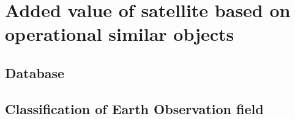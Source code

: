 \bigskip
\section{Added value of satellite based on operational similar objects}
\label{added value}
\bigskip

\bigskip
\subsection{Database}
\bigskip


%

\bigskip
\subsection{Classification of Earth Observation field}
\bigskip




